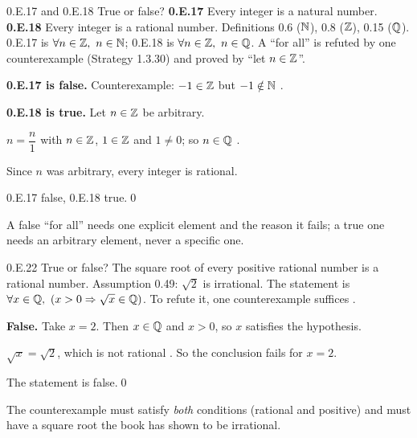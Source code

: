 \begin{bookex}[recommended]{0.E.17 and 0.E.18}
True or false? \textbf{0.E.17} Every integer is a natural number. \textbf{0.E.18} Every integer is a rational number.
\solution
\given Definitions 0.6 ($\mathbb{N}$), 0.8 ($\mathbb{Z}$), 0.15 ($\mathbb{Q}$).
\goal 0.E.17 is $\forall n\in\mathbb{Z},\ n\in\mathbb{N}$; 0.E.18 is $\forall n\in\mathbb{Z},\ n\in\mathbb{Q}$. A ``for all'' is refuted by one counterexample (Strategy 1.3.30) and proved by ``let $n\in\mathbb{Z}$''.
\begin{steps}
\item \textbf{0.E.17 is false.} Counterexample: $-1\in\mathbb{Z}$  but $-1\notin\mathbb{N}$ .
\item \textbf{0.E.18 is true.} Let $n\in\mathbb{Z}$ be arbitrary.
\item $n=\dfrac n1$ with $n\in\mathbb{Z}$, $1\in\mathbb{Z}$ and $1\ne0$; so $n\in\mathbb{Q}$ .
\item Since $n$ was arbitrary, every integer is rational.
\end{steps}
\conclusion 0.E.17 false, 0.E.18 true.\qed
\begin{compare}
\item A false ``for all'' needs one explicit element and the reason it fails; a true one needs an arbitrary element, never a specific one.
\end{compare}
\end{bookex}

\begin{bookex}[essential]{0.E.22}
True or false? The square root of every positive rational number is a rational number.
\solution
\given Assumption 0.49: $\sqrt2$ is irrational.
\goal The statement is $\forall x\in\mathbb{Q},\ (x>0\Rightarrow\sqrt x\in\mathbb{Q})$. To refute it, one counterexample suffices .
\begin{steps}
\item \textbf{False.} Take $x=2$. Then $x\in\mathbb{Q}$  and $x>0$, so $x$ satisfies the hypothesis.
\item $\sqrt x=\sqrt2$, which is not rational . So the conclusion fails for $x=2$.
\end{steps}
\conclusion The statement is false.\qed
\begin{compare}
\item The counterexample must satisfy \emph{both} conditions (rational and positive) and must have a square root the book has shown to be irrational.
\end{compare}
\end{bookex}

